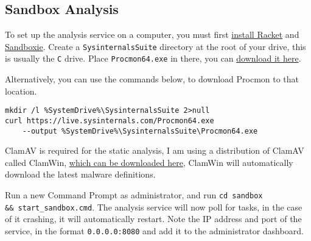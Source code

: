 \begin{appendices}
\section{Sandbox Analysis}
To set up the analysis service on a computer, you must first
\href{https://download.racket-lang.org/}{install Racket} and
\href{https://sandboxie-plus.com/}{Sandboxie}.
Create a \texttt{SysinternalsSuite} directory at the root of your drive,
this is usually the \texttt{C} drive.
Place \texttt{Procmon64.exe} in there, you can
\href{https://learn.microsoft.com/en-us/sysinternals/downloads/procmon}{download it here}.

Alternatively, you can use the commands below, to download Procmon to that location.
\begin{lstlisting}
mkdir /l %SystemDrive%\SysinternalsSuite 2>null
curl https://live.sysinternals.com/Procmon64.exe
    --output %SystemDrive%\SysinternalsSuite\Procmon64.exe
\end{lstlisting}

ClamAV is required for the static analysis,
I am using a distribution of ClamAV called ClamWin,
\href{https://clamwin.com/content/view/18/46/}{which can be downloaded here},
ClamWin will automatically download the latest malware definitions.

Run a new Command Prompt as administrator,
and run \texttt{cd sandbox \\
\&\& start\_sandbox.cmd}.
The analysis service will now poll for tasks,
in the case of it crashing, it will automatically restart.
Note the IP address and port of the service,
in the format \texttt{0.0.0.0:8080}
and add it to the administrator dashboard.

\end{appendices}
